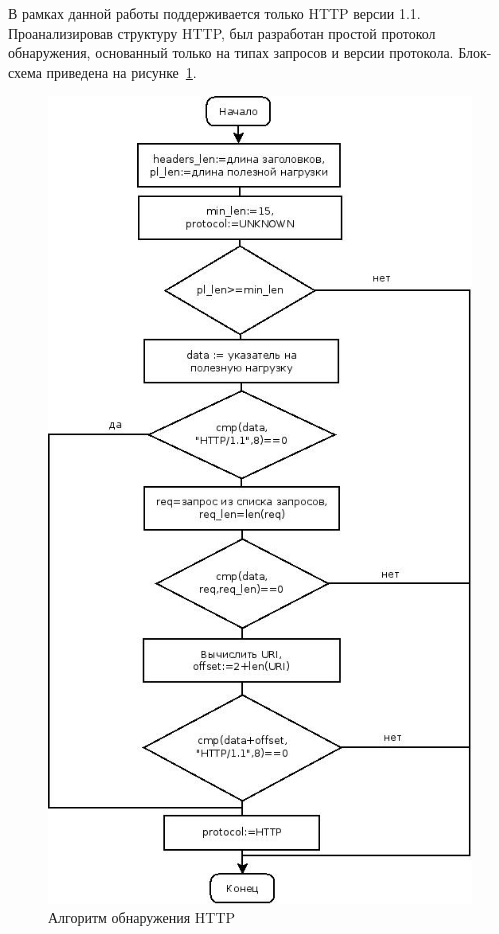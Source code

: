 В рамках данной работы поддерживается только HTTP версии 1.1. Проанализировав структуру HTTP, был разработан простой протокол обнаружения, основанный только на типах запросов и версии протокола. Блок-схема приведена на рисунке~\ref{pic:http_alg}.
\begin{figure}
\centering
\includegraphics[scale=0.5]{pictures/http_alg}
\caption{Алгоритм обнаружения HTTP}
\label{pic:http_alg}
\end{figure}

